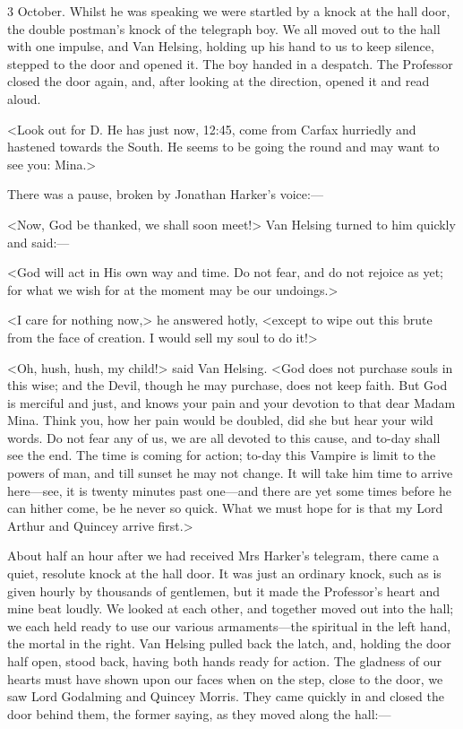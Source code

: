 \begin{diary}{3 October.}
Whilst he was speaking we were startled by a knock at the hall door, the double postman's knock of the telegraph boy. We all moved out to the hall with one impulse, and Van Helsing, holding up his hand to us to keep silence, stepped to the door and opened it. The boy handed in a despatch. The Professor closed the door again, and, after looking at the direction, opened it and read aloud.

<Look out for D\@. He has just now, 12:45, come from Carfax hurriedly and hastened towards the South. He seems to be going the round and may want to see you: Mina.>

There was a pause, broken by Jonathan Harker's voice:—

<Now, God be thanked, we shall soon meet!> Van Helsing turned to him quickly and said:—

<God will act in His own way and time. Do not fear, and do not rejoice as yet; for what we wish for at the moment may be our undoings.>

<I care for nothing now,> he answered hotly, <except to wipe out this brute from the face of creation. I would sell my soul to do it!>

<Oh, hush, hush, my child!> said Van Helsing. <God does not purchase souls in this wise; and the Devil, though he may purchase, does not keep faith. But God is merciful and just, and knows your pain and your devotion to that dear Madam Mina. Think you, how her pain would be doubled, did she but hear your wild words. Do not fear any of us, we are all devoted to this cause, and to-day shall see the end. The time is coming for action; to-day this Vampire is limit to the powers of man, and till sunset he may not change. It will take him time to arrive here—see, it is twenty minutes past one—and there are yet some times before he can hither come, be he never so quick. What we must hope for is that my Lord Arthur and Quincey arrive first.>

About half an hour after we had received Mrs Harker's telegram, there came a quiet, resolute knock at the hall door. It was just an ordinary knock, such as is given hourly by thousands of gentlemen, but it made the Professor's heart and mine beat loudly. We looked at each other, and together moved out into the hall; we each held ready to use our various armaments—the spiritual in the left hand, the mortal in the right. Van Helsing pulled back the latch, and, holding the door half open, stood back, having both hands ready for action. The gladness of our hearts must have shown upon our faces when on the step, close to the door, we saw Lord Godalming and Quincey Morris. They came quickly in and closed the door behind them, the former saying, as they moved along the hall:—


\end{diary}
